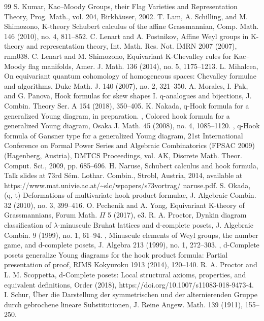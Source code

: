 \begin{thebibliography}{99}
 S. Kumar, Kac–Moody Groups, their Flag Varieties and Representation Theory, Prog. Math., vol. 204, Birkhäuser, 2002.
 T. Lam, A. Schilling, and M. Shimozono, K-theory Schubert calculus of the affine Grassmannian, Comp. Math. 146 (2010), no. 4, 811–852.
 C. Lenart and A. Postnikov, Affine Weyl groups in K-theory and representation theory, Int. Math. Res. Not. IMRN 2007 (2007), rnm038.
 C. Lenart and M. Shimozono, Equivariant K-Chevalley rules for Kac–Moody flag manifolds, Amer. J. Math. 136 (2014), no. 5, 1175–1213.
 L. Mihalcea, On equivariant quantum cohomology of homogeneous spaces: Chevalley formulae and algorithms, Duke Math. J. 140 (2007), no. 2, 321–350.
 A. Morales, I. Pak, and G. Panova, Hook formulas for skew shapes I. q-analogues and bijections, J. Combin. Theory Ser. A 154 (2018), 350–405.
 K. Nakada, q-Hook formula for a generalized Young diagram, in preparation.
 , Colored hook formula for a generalized Young diagram, Osaka J. Math. 45 (2008), no. 4, 1085–1120.
 , q-Hook formula of Gansner type for a generalized Young diagram, 21st International Conference on Formal Power Series and Algebraic Combinatorics (FPSAC 2009) (Hagenberg, Austria), DMTCS Proceedings, vol. AK, Discrete Math. Theor. Comput. Sci., 2009, pp. 685–696.
 H. Naruse, Schubert calculus and hook formula, Talk slides at 73rd Sém. Lothar. Combin., Strobl, Austria, 2014, available at https://www.mat.univie.ac.at/\textasciitilde{}slc/wpapers/s73vortrag/ naruse.pdf.
 S. Okada, (q, t)-Deformations of multivariate hook product formulae, J. Algebraic Combin. 32 (2010), no. 3, 399–416.
 O. Pechenik and A. Yong, Equivariant K-theory of Grassmannians, Forum Math. $\Pi$ 5 (2017), e3.
 R. A. Proctor, Dynkin diagram classification of $\lambda$-minuscule Bruhat lattices and d-complete posets, J. Algebraic Combin. 9 (1999), no. 1, 61–94.
 , Minuscule elements of Weyl groups, the number game, and d-complete posets, J. Algebra 213 (1999), no. 1, 272–303.
 , d-Complete posets generalize Young diagrams for the hook product formula: Partial presentation of proof, RIMS Kokyuroku 1913 (2014), 120–140.
 R. A. Proctor and L. M. Scoppetta, d-Complete posets: Local structural axioms, properties, and equivalent definitions, Order (2018), https://doi.org/10.1007/s11083-018-9473-4.
 I. Schur, Über die Darstellung der symmetrischen und der alternierenden Gruppe durch gebrochene lineare Substitutionen, J. Reine Angew. Math. 139 (1911), 155–250.

\end{thebibliography}
